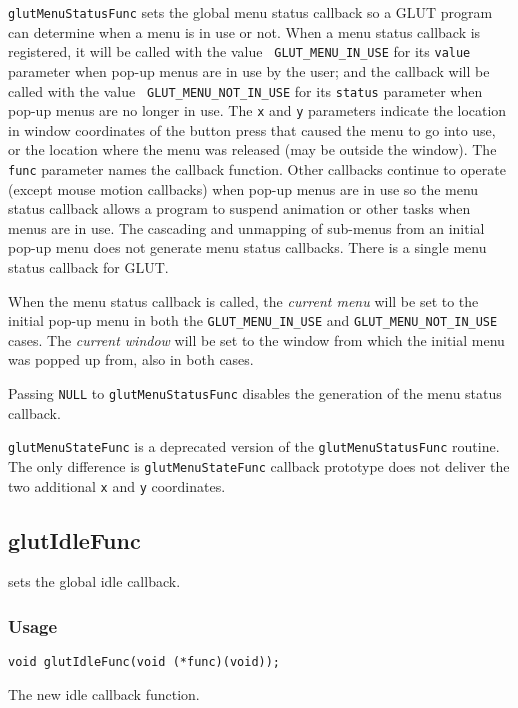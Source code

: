 {\tt glutMenuStatusFunc} sets the global menu status callback so a GLUT
program can determine when a menu is in use or not.  When a menu status
callback is registered, it will be called with the value {\tt
GLUT\_MENU\_IN\_USE} for its {\tt value} parameter when pop-up menus are
in use by the user; and the callback will be called with the value {\tt
GLUT\_MENU\_NOT\_IN\_USE} for its {\tt status} parameter when pop-up menus
are no longer in use.  The {\tt x} and {\tt y} parameters indicate the
location in window coordinates of the button press that caused the menu
to go into use, or the location where the menu was released (may be
outside the window).  The {\tt func} parameter names the callback
function.  Other callbacks continue to operate (except mouse motion 
callbacks) when pop-up menus are in use so the menu status callback
allows a program to suspend animation or other tasks when menus are in
use.  The cascading and unmapping of sub-menus from an initial pop-up
menu does not generate menu status callbacks.  There is
a single menu status callback for GLUT.

When the menu status callback is called, the {\em current menu} will be
set to the initial pop-up menu in both the {\tt GLUT\_MENU\_IN\_USE} and
{\tt GLUT\_MENU\_NOT\_IN\_USE} cases.  The {\em current window} will be
set to the window from which the initial menu was popped up from,
also in both cases.

Passing {\tt NULL} to {\tt glutMenuStatusFunc}
disables the generation of the menu status callback.

{\tt glutMenuStateFunc} is a deprecated version of the {\tt glutMenuStatusFunc}
routine.  The only difference is {\tt glutMenuStateFunc} callback prototype
does not deliver the two additional {\tt x} and {\tt y} coordinates.

\subsection{glutIdleFunc}

 sets the global idle callback.

\subsubsection*{Usage}
\begin{verbatim}
void glutIdleFunc(void (*func)(void));
\end{verbatim}
\begin{description}
\itemsep 0in
\item[{\tt func}]
The new idle callback function.
\end{description}

